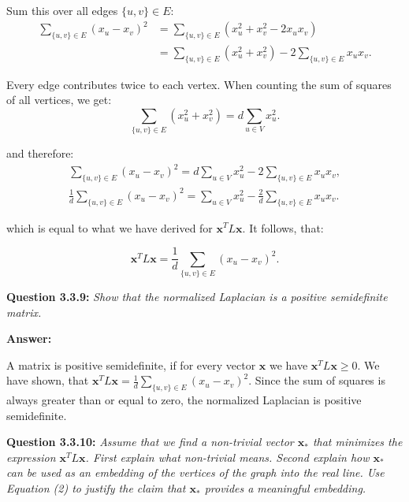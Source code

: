 \documentclass{article}
\begin{document}
\begin{multicols}{2}
    Sum this over all edges \(\{u,v\}\in E\):
    \begin{align*}   
    \sum_{\{u,v\}\in E}(x_u - x_v)^2 &= \sum_{\{u,v\}\in E}(x_u^2 + x_v^2 - 2x_u x_v)\\
    &= \sum_{\{u,v\}\in E}(x_u^2 + x_v^2) - 2\sum_{\{u,v\}\in E}x_u x_v.
    \end{align*}

    Every edge contributes twice to each vertex. When counting the sum of squares of all vertices, we get:
    \[
    \sum_{\{u,v\}\in E}(x_u^2 + x_v^2) = d \sum_{u \in V} x_u^2.
    \]

    and therefore:
    \begin{align*}
        \sum_{\{u,v\}\in E}(x_u - x_v)^2 = d\sum_{u \in V}x_u^2 - 2\sum_{\{u,v\}\in E}x_u x_v,\\
        \frac{1}{d}\sum_{\{u,v\}\in E}(x_u - x_v)^2 = \sum_{u \in V} x_u^2 - \frac{2}{d}\sum_{\{u,v\}\in E}x_u x_v.
    \end{align*}
    
    which is equal to what we have derived for \( \mathbf{x}^T L \mathbf{x} \).
    It follows, that:

    \[
    \mathbf{x}^T L \mathbf{x} = \frac{1}{d}\sum_{\{u,v\}\in E}(x_u - x_v)^2.
    \]
    \vspace{0.5cm}

    \noindent \textbf{Question 3.3.9:}  
    \textit{Show that the normalized Laplacian is a positive semidefinite matrix.}

    \textbf{Answer:}

    A matrix is positive semidefinite, if for every vector \( \mathbf{x} \) we have \( \mathbf{x}^T L \mathbf{x} \geq 0 \). 
    We have shown, that \( \mathbf{x}^T L \mathbf{x} = \frac{1}{d}\sum_{\{u,v\}\in E}(x_u - x_v)^2 \). Since the sum of squares is always greater than or equal to zero, the normalized Laplacian is positive semidefinite.
    \vspace{0.5cm}

    \noindent \textbf{Question 3.3.10:}  
    \textit{Assume that we find a non-trivial vector \( \mathbf{x}_* \) that minimizes the expression \( \mathbf{x}^T L \mathbf{x} \). First explain what non-trivial means. Second explain how \( \mathbf{x}_* \) can be used as an embedding of the vertices of the graph into the real line. Use Equation (2) to justify the claim that \( \mathbf{x}_* \) provides a meaningful embedding.}


\end{multicols}
\end{document}
